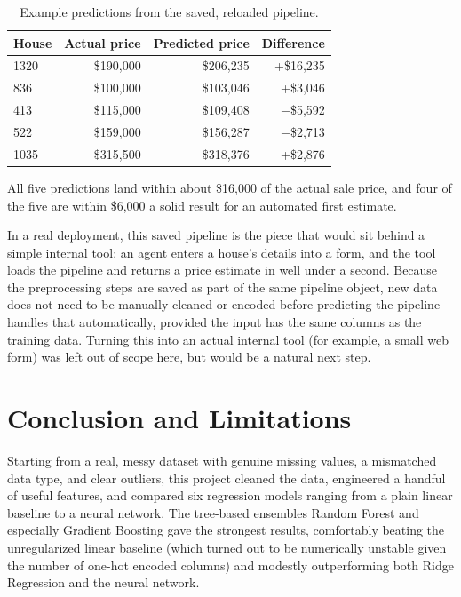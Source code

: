 \documentclass[11pt]{article}
\begin{document}
\begin{table}[H]
    \centering
    \caption{Example predictions from the saved, reloaded pipeline.}
    \label{tab:deployment}
    \begin{tabular}{lrrr}
        \toprule
        \textbf{House} & \textbf{Actual price} & \textbf{Predicted price} & \textbf{Difference} \\
        \midrule
        1320 & \$190,000 & \$206,235 & +\$16,235 \\
        836  & \$100,000 & \$103,046 & +\$3,046 \\
        413  & \$115,000 & \$109,408 & $-$\$5,592 \\
        522  & \$159,000 & \$156,287 & $-$\$2,713 \\
        1035 & \$315,500 & \$318,376 & +\$2,876 \\
        \bottomrule
    \end{tabular}
\end{table}

All five predictions land within about \$16,000 of the actual sale price, and four of
the five are within \$6,000  a solid result for an automated first estimate.

In a real deployment, this saved pipeline is the piece that would sit behind a simple
internal tool: an agent enters a house's details into a form, and the tool loads the
pipeline and returns a price estimate in well under a second. Because the
preprocessing steps are saved as part of the same pipeline object, new data does not
need to be manually cleaned or encoded before predicting  the pipeline handles that
automatically, provided the input has the same columns as the training data. Turning
this into an actual internal tool (for example, a small web form) was left out of
scope here, but would be a natural next step.

\section{Conclusion and Limitations}

Starting from a real, messy dataset with genuine missing values, a mismatched data
type, and clear outliers, this project cleaned the data, engineered a handful of
useful features, and compared six regression models ranging from a plain linear
baseline to a neural network. The tree-based ensembles  Random Forest and especially
Gradient Boosting  gave the strongest results, comfortably beating the unregularized
linear baseline (which turned out to be numerically unstable given the number of
one-hot encoded columns) and modestly outperforming both Ridge Regression and the
neural network.
\end{document}
